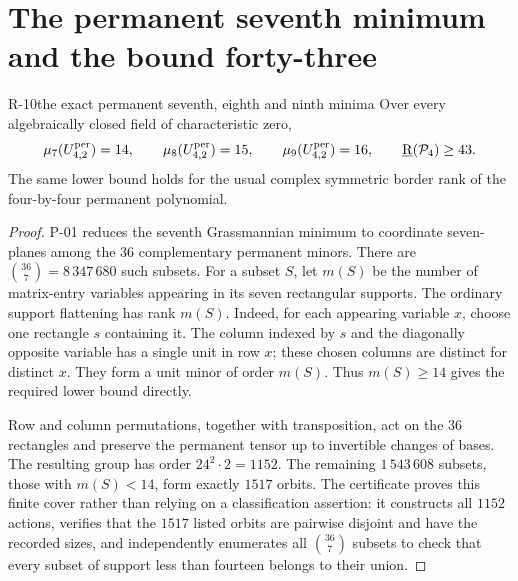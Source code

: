 \section{The permanent seventh minimum and the bound forty-three}

\begin{finding}{R-10}{the exact permanent seventh, eighth and ninth minima}
Over every algebraically closed field of characteristic zero,
\[
 \mu_7(U^{\mathrm{per}}_{4,2})=14,\qquad
 \mu_8(U^{\mathrm{per}}_{4,2})=15,\qquad
 \mu_9(U^{\mathrm{per}}_{4,2})=16,
 \qquad \underline{\mathrm R}(\mathcal P_4)\geq43.
\]
The same lower bound holds for the usual complex symmetric border
rank of the four-by-four permanent polynomial.
\end{finding}
\begin{proof}
P-01 reduces the seventh Grassmannian minimum to coordinate
seven-planes among the $36$ complementary permanent minors.
There are $\binom{36}{7}=8\,347\,680$ such subsets. For a subset
$S$, let $m(S)$ be the number of matrix-entry variables appearing
in its seven rectangular supports. The ordinary support flattening
has rank $m(S)$. Indeed, for each appearing variable $x$, choose
one rectangle $s$ containing it. The column indexed by $s$ and
the diagonally opposite variable has a single unit in row $x$;
these chosen columns are distinct for distinct $x$. They form
a unit minor of order $m(S)$. Thus $m(S)\geq14$ gives the required
lower bound directly.

Row and column permutations, together with transposition, act on
the $36$ rectangles and preserve the permanent tensor up to
invertible changes of bases. The resulting group has order
$24^2\cdot2=1152$. The remaining $1\,543\,608$ subsets, those with
$m(S)<14$, form exactly $1517$ orbits. The certificate proves this
finite cover rather than relying on a classification assertion:
it constructs all $1152$ actions, verifies that the $1517$ listed
orbits are pairwise disjoint and have the recorded sizes, and
independently enumerates all $\binom{36}{7}$ subsets to check that
every subset of support less than fourteen belongs to their union.


\end{proof}
